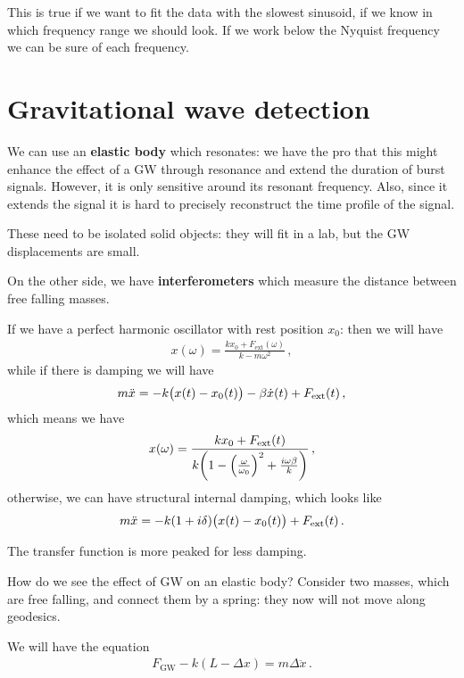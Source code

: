 \documentclass[main.tex]{subfiles}
\begin{document}
This is true if we want to fit the data with the slowest sinusoid, if we know in which frequency range we should look.
If we work below the Nyquist frequency we can be sure of each frequency.

\section{Gravitational wave detection}

We can use an \textbf{elastic body} which resonates: we have the pro that this might enhance the effect of a GW through resonance and extend the duration of burst signals. 
However, it is only sensitive around its resonant frequency. 
Also, since it extends the signal it is hard to precisely reconstruct the time profile of the signal. 

These need to be isolated solid objects: they will fit in a lab, but the GW displacements are small. 

On the other side, we have \textbf{interferometers} which measure the distance between free falling masses. 

If we have a perfect harmonic oscillator with rest position \(x_0 \): then we will have 
%
\begin{align}
x(\omega ) = \frac{k x_0 + F _{\text{ext}}(\omega )}{k - m \omega^2}
\,,
\end{align}
%
while if there is damping we will have 
%
\begin{align}
m \ddot{x} = - k \qty(x(t) - x_0 (t)) - \beta \dot{x}(t) + F _{\text{ext}}(t)
\,,
\end{align}
%
which means we have 
%
\begin{align}
x(\omega ) = \frac{k x_0 + F _{\text{ext}}(t)}{k \qty(1 - \qty( \frac{\omega}{\omega_0 })^2 + \frac{i \omega \beta }{k})}
\,,
\end{align}
%
otherwise, we can have structural internal damping, which looks like 
%
\begin{align}
m \ddot{x} = - k (1 + i \delta ) \qty(x(t) - x_0 (t)) + F _{\text{ext}}(t)
\,.
\end{align}

The transfer function is more peaked for less damping. 

How do we see the effect of GW on an elastic body? Consider two masses, which are free falling, and connect them by a spring: they now will not move along geodesics.

We will have the equation 
%
\begin{align}
F _{\text{GW}} - k (L - \Delta x) = m \Delta \ddot{x}
\,.
\end{align}
\end{document}
